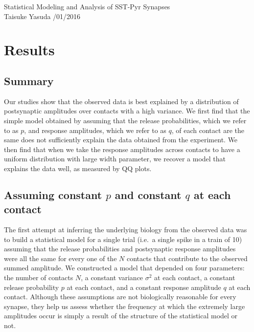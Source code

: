 \documentclass{article}
\author{Taisuke Yasuda}
\begin{document}
\begin{center}
  {\LARGE Statistical Modeling and Analysis of SST-Pyr Synapses} \\
  \vspace{10pt}
  {Taisuke Yasuda /01/2016}
\end{center}

\section{Results}
\subsection{Summary}
Our studies show that the observed data is best explained by a distribution of postsynaptic amplitudes over contacts with a high variance. We first find that the simple model obtained by assuming that the release probabilities, which we refer to as $p$, and response amplitudes, which we refer to as $q$, of each contact are the same does not sufficiently explain the data obtained from the experiment. We then find that when we take the response amplitudes across contacts to have a uniform distribution with large width parameter, we recover a model that explains the data well, as measured by QQ plots.

\subsection{Assuming constant $p$ and constant $q$ at each contact}
The first attempt at inferring the underlying biology from the observed data was to build a statistical model for a single trial (i.e.\ a single spike in a train of 10) assuming that the release probabilities and postsynaptic response amplitudes were all the same for every one of the $N$ contacts that contribute to the observed summed amplitude. We constructed a model that depended on four parameters: the number of contacts $N$, a constant variance $\sigma^2$ at each contact, a constant release probability $p$ at each contact, and a constant response amplitude $q$ at each contact. Although these assumptions are not biologically reasonable for every synapse, they help us assess whether the frequency at which the extremely large amplitudes occur is simply a result of the structure of the statistical model or not.
\end{document}
